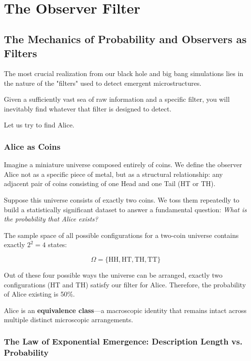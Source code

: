 \chapter{The Observer Filter}
\label{chap:the-filter}

\section{The Mechanics of Probability and Observers as Filters}

The most crucial realization from our black hole and big bang simulations lies in the nature of the "filters" used to detect emergent microstructures.

Given a sufficiently vast sea of raw information and a specific filter, you will inevitably find whatever that filter is designed to detect.

Let us try to find Alice.


\subsection{Alice as Coins}

Imagine a miniature universe composed entirely of coins.
We define the observer Alice not as a specific piece of metal, but as a structural relationship: any adjacent pair of coins consisting of one Head and one Tail (HT or TH).

Suppose this universe consists of exactly two coins.
We toss them repeatedly to build a statistically significant dataset to answer a fundamental question: \emph{What is the probability that Alice exists?}

The sample space of all possible configurations for a two-coin universe contains exactly $2^2 = 4$ states:

\[
\Omega = \{\text{HH}, \text{HT}, \text{TH}, \text{TT}\}
\]

Out of these four possible ways the universe can be arranged, exactly two configurations ($\text{HT}$ and $\text{TH}$) satisfy our filter for Alice.
Therefore, the probability of Alice existing is 50\%. 

Alice is an \textbf{equivalence class}—a macroscopic identity that remains intact across multiple distinct microscopic arrangements.


\subsection{The Law of Exponential Emergence: Description Length vs. Probability}

